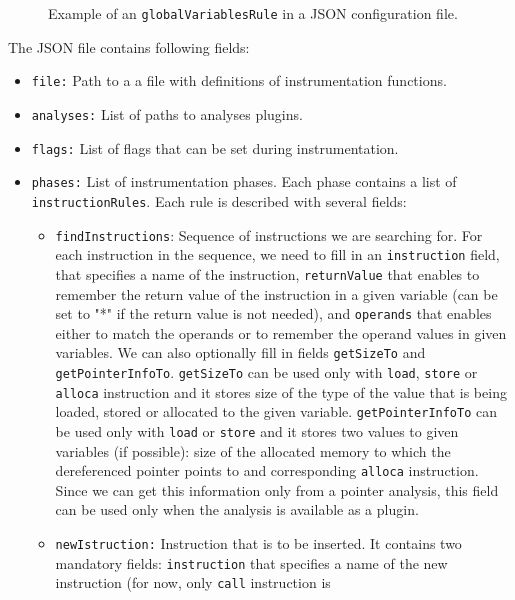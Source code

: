 \begin{figure}[h]

\caption{Example of an \texttt{globalVariablesRule} in a JSON configuration file.}
\label{fig:json_example2}
\end{figure}

The JSON file contains following fields:

\medskip
\begin{itemize}
\item \texttt{file:} Path to a a file with definitions of instrumentation functions.
\item \texttt{analyses:} List of paths to analyses plugins.
\item \texttt{flags:} List of flags that can be set during instrumentation.
\item \texttt{phases:} List of instrumentation phases. Each phase contains a
  list of \texttt{instructionRules}. Each rule is described with several fields:
  \begin{itemize}
    \item \texttt{findInstructions}: Sequence of instructions we are searching
    for. For each instruction in the sequence, we need to fill in an
        \texttt{instruction} field, that specifies a name of the instruction,
        \texttt{returnValue} that enables to remember the return value of the
        instruction in a given variable (can be set to "*" if the return value
        is not needed), and \texttt{operands} that enables either to match the
        operands or to remember the operand values in given variables. We can
        also optionally fill in fields \texttt{getSizeTo} and
        \texttt{getPointerInfoTo}. \texttt{getSizeTo} can be used only with
        \texttt{load}, \texttt{store} or \texttt{alloca} instruction and it
        stores size of the type of the value that is being loaded, stored or
        allocated to the given variable. \texttt{getPointerInfoTo} can be used
        only with \texttt{load} or \texttt{store} and it stores two values to
        given variables (if possible): size of the allocated memory to which
        the dereferenced pointer points to and corresponding \texttt{alloca}
        instruction. Since we can get this information only from a pointer
        analysis, this field can be used only when the analysis is available as
        a plugin.
    \item \texttt{newIstruction:} Instruction that is to be inserted. It
    contains two mandatory fields: \texttt{instruction} that specifies a name
    of the new instruction (for now, only \texttt{call} instruction is

\end{itemize}
\end{itemize}

